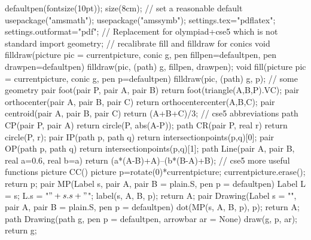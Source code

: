
\theoremstyle{definition}
\newtheorem{conjecture}[theorem]{Conjecture}
\newtheorem{definition}[theorem]{Definition}
\newtheorem{fact}[theorem]{Fact}
\newtheorem{ques}[theorem]{Question}
\newtheorem{exercise}[theorem]{Exercise}
\newtheorem{problem}[theorem]{Problem}

\newtheorem*{conjecture*}{Conjecture}
\newtheorem*{definition*}{Definition}
\newtheorem*{fact*}{Fact}
\newtheorem*{ques*}{Question}
\newtheorem*{exercise*}{Exercise}
\newtheorem*{problem*}{Problem}

\usepackage{mathtools}
\usepackage{hyperref}
\usepackage[shortlabels]{enumitem}
\usepackage{multirow}
\usepackage{ellipsis}

\usepackage{epic} %
\usepackage{tikz-cd} %
\usepackage{asymptote} %
\begin{asydef}
	defaultpen(fontsize(10pt));
	size(8cm); // set a reasonable default
	usepackage("amsmath");
	usepackage("amssymb");
	settings.tex="pdflatex";
	settings.outformat="pdf";
	// Replacement for olympiad+cse5 which is not standard
	import geometry;
	// recalibrate fill and filldraw for conics
	void filldraw(picture pic = currentpicture, conic g, pen fillpen=defaultpen, pen
	drawpen=defaultpen)
	{ filldraw(pic, (path) g, fillpen, drawpen); }
	void fill(picture pic = currentpicture, conic g, pen p=defaultpen)
	{ filldraw(pic, (path) g, p); }
	// some geometry
	pair foot(pair P, pair A, pair B) { return foot(triangle(A,B,P).VC); }
	pair orthocenter(pair A, pair B, pair C) { return orthocentercenter(A,B,C); }
	pair centroid(pair A, pair B, pair C) { return (A+B+C)/3; }
	// cse5 abbreviations
	path CP(pair P, pair A) { return circle(P, abs(A-P)); }
	path CR(pair P, real r) { return circle(P, r); }
	pair IP(path p, path q) { return intersectionpoints(p,q)[0]; }
	pair OP(path p, path q) { return intersectionpoints(p,q)[1]; }
	path Line(pair A, pair B, real a=0.6, real b=a) { return (a*(A-B)+A)--(b*(B-A)+B); }
	// cse5 more useful functions
	picture CC() {
		picture p=rotate(0)*currentpicture;
		currentpicture.erase();
		return p;
	}
	pair MP(Label s, pair A, pair B = plain.S, pen p = defaultpen) {
		Label L = s;
		L.s = "$"+s.s+"$";
		label(s, A, B, p);
		return A;
	}
	pair Drawing(Label s = "", pair A, pair B = plain.S, pen p = defaultpen) {
		dot(MP(s, A, B, p), p);
		return A;
	}
	path Drawing(path g, pen p = defaultpen, arrowbar ar = None) {
		draw(g, p, ar);
		return g;
	}
\end{asydef}

